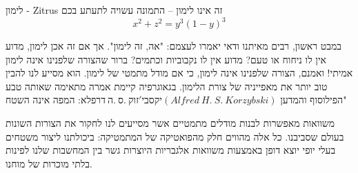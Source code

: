 \begin{surferPage}{ לימון - Zitrus}
זה אינו לימון – התמונה עשויה לתעתע בכם\\
\smallskip
\[x^2 + z^2 = y^3 (1 - y)^3\] 


\singlespacing
במבט ראשון, רבים מאיתנו ודאי יאמרו לעצמם: "אה, זה לימון". אך אם זה אכן לימון, מדוע אין לו ניחוח או טעם? מדוע אין לו נקבוביות וכתמים? ברור שהצורה שלפנינו אינה לימון אמיתי! 
\singlespacing
ואמנם, הצורה שלפנינו אינה לימון, כי אם מודל מתמטי של לימון. הוא מסייע לנו להבין טוב יותר את מאפייניה של צורת הלימון. בגאוגרפיה קיימת אמרה מתאימה שאותה טבע הפילוסוף והמדען $אלפרד \ ה.\ ס.\ קוז'יבסקי (Alfred\ H.\ S.\ Korzybski)$: המפה אינה השטח" \\
\singlespacing

משוואות מאפשרות לבנות מודלים מתמטיים אשר מסייעים לנו לחקור את הצורות השונות בעולם שסביבנו. 
\singlespacing
כל אלה מהווים חלק מהפואטיקה של המתמטיקה: ביכולתנו ליצור משטחים בעלי יופי יוצא דופן באמצעות משוואות אלגבריות היוצרות גשר בין המחשבות שלנו לפינות בלתי מוכרות של מוחנו.
\end{surferPage}
